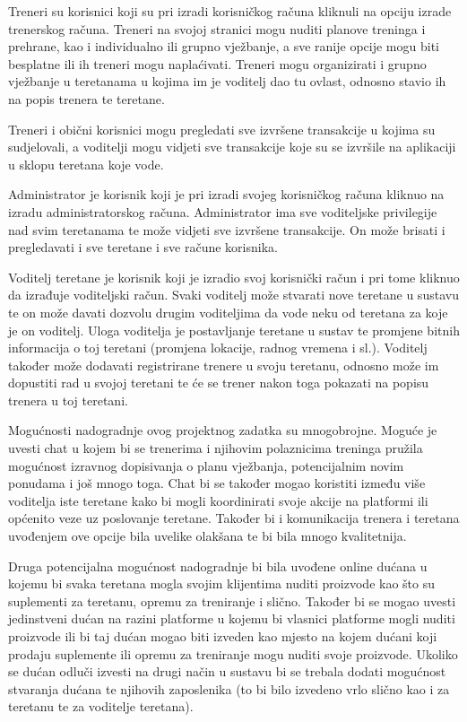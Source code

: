 		Treneri su korisnici koji su pri izradi korisničkog računa kliknuli na opciju izrade trenerskog računa. Treneri na
		svojoj stranici mogu nuditi planove treninga i prehrane, kao i individualno ili grupno vježbanje, a sve ranije
		opcije mogu biti besplatne ili ih treneri mogu naplaćivati. Treneri mogu organizirati i grupno vježbanje u
		teretanama u kojima im je voditelj dao tu ovlast, odnosno stavio ih na popis trenera te teretane.
	
		
		Treneri i obični korisnici mogu pregledati sve izvršene transakcije u kojima su sudjelovali, a voditelji mogu
		vidjeti sve transakcije koje su se izvršile na aplikaciji u sklopu teretana koje vode.
		
		Administrator je korisnik koji je pri izradi svojeg korisničkog računa kliknuo na izradu administratorskog
		računa. Administrator ima sve voditeljske privilegije nad svim teretanama te može vidjeti sve izvršene
		transakcije. On može brisati i pregledavati i sve teretane i sve račune korisnika.
		
		Voditelj teretane je korisnik koji je izradio svoj korisnički račun i pri tome kliknuo da izrađuje voditeljski račun.
		Svaki voditelj može stvarati nove teretane u sustavu te on može davati dozvolu drugim voditeljima da vode
		neku od teretana za koje je on voditelj. Uloga voditelja je postavljanje teretane u sustav te promjene bitnih
		informacija o toj teretani (promjena lokacije, radnog vremena i sl.). Voditelj također može dodavati
		registrirane trenere u svoju teretanu, odnosno može im dopustiti rad u svojoj teretani te će se trener nakon
		toga pokazati na popisu trenera u toj teretani.
		
	
	
		\vspace{5mm}
		
		Mogućnosti nadogradnje ovog projektnog zadatka su mnogobrojne. Moguće je uvesti chat u kojem bi se trenerima i njihovim polaznicima treninga pružila mogućnost izravnog dopisivanja o planu vježbanja, potencijalnim novim ponudama i 
		još mnogo toga. Chat bi se također mogao koristiti između više voditelja iste teretane kako bi mogli koordinirati svoje akcije na platformi ili općenito veze uz poslovanje teretane. Također bi i komunikacija trenera i teretana uvođenjem ove 
		opcije bila uvelike olakšana te bi bila mnogo kvalitetnija. 
		
		Druga potencijalna mogućnost nadogradnje bi bila uvođene online dućana u kojemu 
		bi svaka teretana mogla svojim klijentima nuditi proizvode kao što su suplementi za 
		teretanu, opremu za treniranje i slično. Također bi se mogao uvesti jedinstveni 
		dućan na razini platforme u kojemu bi vlasnici platforme mogli nuditi proizvode ili bi 
		taj dućan mogao biti izveden kao mjesto na kojem dućani koji prodaju suplemente ili 
		opremu za treniranje mogu nuditi svoje proizvode. Ukoliko se dućan odluči izvesti na 
		drugi način u sustavu bi se trebala dodati mogućnost stvaranja dućana te njihovih 
		zaposlenika (to bi bilo izvedeno vrlo slično kao i za teretanu te za voditelje teretana).
		
